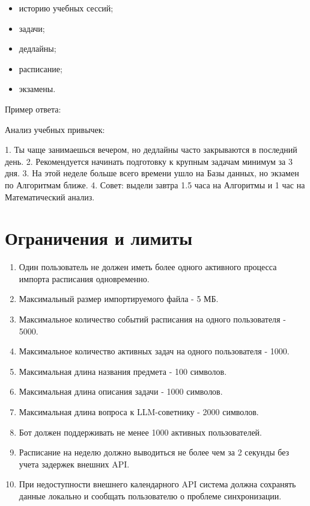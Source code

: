 \documentclass[10pt,a4paper,final]{article} %
\begin{document}
\begin{itemize}
    \item историю учебных сессий;
    \item задачи;
    \item дедлайны;
    \item расписание;
    \item экзамены.
\end{itemize}

Пример ответа:

\begin{Code}
Анализ учебных привычек:

1. Ты чаще занимаешься вечером, но дедлайны часто закрываются в последний день.
2. Рекомендуется начинать подготовку к крупным задачам минимум за 3 дня.
3. На этой неделе больше всего времени ушло на Базы данных, но экзамен по Алгоритмам ближе.
4. Совет: выдели завтра 1.5 часа на Алгоритмы и 1 час на Математический анализ.
\end{Code}

\section{Ограничения и лимиты}

\begin{enumerate}[label=\arabic*.]
    \item Один пользователь не должен иметь более одного активного процесса импорта расписания одновременно.
    \item Максимальный размер импортируемого файла - 5 МБ.
    \item Максимальное количество событий расписания на одного пользователя - 5000.
    \item Максимальное количество активных задач на одного пользователя - 1000.
    \item Максимальная длина названия предмета - 100 символов.
    \item Максимальная длина описания задачи - 1000 символов.
    \item Максимальная длина вопроса к LLM-советнику - 2000 символов.
    \item Бот должен поддерживать не менее 1000 активных пользователей.
    \item Расписание на неделю должно выводиться не более чем за 2 секунды без учета задержек внешних API.
    \item При недоступности внешнего календарного API система должна сохранять данные локально и сообщать пользователю о проблеме синхронизации.
\end{enumerate}
\end{document}
